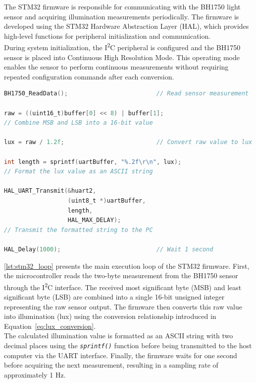 \documentclass[11pt]{article}
\begin{document}
The STM32 firmware is responsible for communicating with the BH1750 light sensor and acquiring illumination measurements periodically. The firmware is developed using the STM32 Hardware Abstraction Layer (HAL), which provides high-level functions for peripheral initialization and communication.\\[0.1em]

During system initialization, the I\textsuperscript{2}C peripheral is configured and the BH1750 sensor is placed into Continuous High Resolution Mode. This operating mode enables the sensor to perform continuous measurements without requiring repeated configuration commands after each conversion.\\[0.1em]

\begin{lstlisting}[language=C, caption={Main measurement loop of the STM32 firmware.}, label={lst:stm32_loop}]
BH1750_ReadData();                         // Read sensor measurement

raw = ((uint16_t)buffer[0] << 8) | buffer[1];
// Combine MSB and LSB into a 16-bit value

lux = raw / 1.2f;                          // Convert raw value to lux

int length = sprintf(uartBuffer, "%.2f\r\n", lux);
// Format the lux value as an ASCII string

HAL_UART_Transmit(&huart2,
                  (uint8_t *)uartBuffer,
                  length,
                  HAL_MAX_DELAY);
// Transmit the formatted string to the PC

HAL_Delay(1000);                           // Wait 1 second
\end{lstlisting}

\vspace{0.5em}

\autoref{lst:stm32_loop} presents the main execution loop of the STM32 firmware. First, the microcontroller reads the two-byte measurement from the BH1750 sensor through the I\textsuperscript{2}C interface. The received most significant byte (MSB) and least significant byte (LSB) are combined into a single 16-bit unsigned integer representing the raw sensor output. The firmware then converts this raw value into illumination (lux) using the conversion relationship introduced in Equation~\eqref{eq:lux_conversion}.\\[0.1em]

The calculated illumination value is formatted as an ASCII string with two decimal places using the \textit{\texttt{sprintf()}} function before being transmitted to the host computer via the UART interface. Finally, the firmware waits for one second before acquiring the next measurement, resulting in a sampling rate of approximately 1 Hz.
\end{document}
